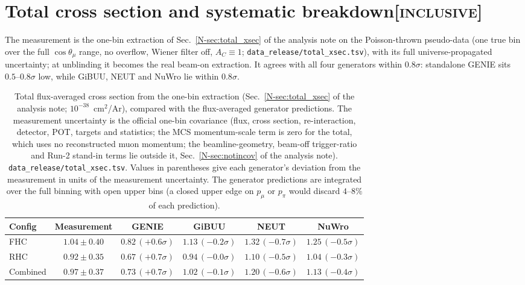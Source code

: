 \documentclass[11pt,a4paper]{article}
\newcommand{\noteref}[2]{#1~\ref{N-#2} of the analysis note}
\newcommand{\scopetag}[1]{\hfill{\normalfont\small\textsc{[#1]}}}
\begin{document}
\section[Total cross section and systematic breakdown]{Total cross section and systematic breakdown\scopetag{inclusive}}
\label{sec:supp_total}

The measurement is the one-bin extraction of \noteref{Sec.}{sec:total_xsec} on the
Poisson-thrown pseudo-data (one true bin over the full $\cos\theta_\mu$ range, no overflow,
Wiener filter off, $A_C\equiv1$; \texttt{data\_release/total\_xsec.tsv}), with its full
universe-propagated uncertainty; at unblinding it becomes the real beam-on extraction.
It agrees with all four generators within $0.8\sigma$: standalone GENIE sits
$0.5$--$0.8\sigma$ low, while GiBUU, NEUT and NuWro lie within $0.8\sigma$.

\begin{table}[H]
  \centering
  \caption{Total flux-averaged cross section from the one-bin extraction
    (\noteref{Sec.}{sec:total_xsec}; $10^{-38}$~cm$^2$/Ar), compared with the flux-averaged
    generator predictions. The measurement uncertainty is the official one-bin
    covariance (flux, cross section, re-interaction, detector, POT, targets and statistics; the MCS
    momentum-scale term is zero for the total, which uses no reconstructed muon momentum; the
    beamline-geometry, beam-off trigger-ratio and Run-2 stand-in terms lie outside it,
    \noteref{Sec.}{sec:notincov}). \texttt{data\_release/total\_xsec.tsv}. Values in
    parentheses give each generator's deviation from the measurement in units of the
    measurement uncertainty. The generator predictions are integrated over the full binning with open upper bins
    (a closed upper edge on $p_\mu$ or $p_\pi$ would discard $4$--$8\%$ of each prediction).}
  \label{tab:total_xsec}
  \begin{tabular}{lccccc}
\toprule
Config & Measurement & GENIE & GiBUU & NEUT & NuWro \\
\midrule
    FHC      & $1.04 \pm 0.40$ & $0.82\,(+0.6\sigma)$ & $1.13\,(-0.2\sigma)$ & $1.32\,(-0.7\sigma)$ & $1.25\,(-0.5\sigma)$ \\
    RHC      & $0.92 \pm 0.35$ & $0.67\,(+0.7\sigma)$ & $0.94\,(-0.0\sigma)$ & $1.10\,(-0.5\sigma)$ & $1.04\,(-0.3\sigma)$ \\
    Combined & $0.97 \pm 0.37$ & $0.73\,(+0.7\sigma)$ & $1.02\,(-0.1\sigma)$ & $1.20\,(-0.6\sigma)$ & $1.13\,(-0.4\sigma)$ \\
\bottomrule
\end{tabular}
\end{table}
\end{document}
